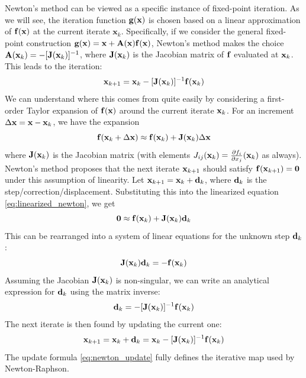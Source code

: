 Newton's method can be viewed as a specific instance of fixed-point iteration. As we will see, the iteration function $\mathbf{g}(\mathbf{x})$ is chosen based on a linear approximation of $\mathbf{f}(\mathbf{x})$ at the current iterate $\mathbf x_k$. Specifically, if we consider the general fixed-point construction $\mathbf{g}(\mathbf{x}) = \mathbf{x} + \mathbf{A}(\mathbf{x})\mathbf{f}(\mathbf{x})$, Newton's method makes the choice $\mathbf{A}(\mathbf{x}_k) = -[\mathbf{J}(\mathbf{x}_k)]^{-1}$, where $\mathbf{J}(\mathbf{x}_k)$ is the Jacobian matrix of $\mathbf{f}$ evaluated at $\mathbf{x}_k$. This leads to the iteration:
\begin{equation}
    \mathbf{x}_{k+1} = \mathbf{x}_k - [\mathbf{J}(\mathbf{x}_k)]^{-1} \mathbf{f}(\mathbf{x}_k)
\end{equation}
We can understand where this comes from quite easily by considering a first-order Taylor expansion of $\mathbf{f}(\mathbf{x})$ around the current iterate $\mathbf{x}_k$. For an increment $\Delta\mathbf{x} = \mathbf{x} - \mathbf{x}_k$, we have the expansion
\begin{equation}
    \mathbf{f}(\mathbf{x}_k + \Delta\mathbf{x}) \approx \mathbf{f}(\mathbf{x}_k) + \mathbf{J}(\mathbf{x}_k) \Delta\mathbf{x}
    \label{eq:linearized_newton}
\end{equation}
where $\mathbf{J}(\mathbf{x}_k)$ is the Jacobian matrix (with elements $J_{ij}(\mathbf{x}_k) = \tfrac{\partial f_i}{\partial x_j}(\mathbf{x}_k)$ as always). Newton's method proposes that the next iterate $\mathbf{x}_{k+1}$ should satisfy $\mathbf{f}(\mathbf{x}_{k+1}) = \mathbf{0}$ under this assumption of linearity. Let $\mathbf{x}_{k+1} = \mathbf{x}_k + \mathbf{d}_k$, where $\mathbf{d}_k$ is the step/correction/displacement. Substituting this into the linearized equation \autoref{eq:linearized_newton}, we get
\begin{equation}
    \mathbf{0} \approx \mathbf{f}(\mathbf{x}_k) + \mathbf{J}(\mathbf{x}_k) \mathbf{d}_k
\end{equation}
This can be rearranged into a system of linear equations for the unknown step $\mathbf{d}_k$:
\begin{equation}
    \mathbf{J}(\mathbf{x}_k) \mathbf{d}_k = -\mathbf{f}(\mathbf{x}_k)
\end{equation}
Assuming the Jacobian $\mathbf{J}(\mathbf{x}_k)$ is non-singular, we can write an analytical expression for $\mathbf{d}_k$ using the matrix inverse:
\begin{equation}
    \mathbf{d}_k = -[\mathbf{J}(\mathbf{x}_k)]^{-1} \mathbf{f}(\mathbf{x}_k)
\end{equation}
The next iterate is then found by updating the current one:
\begin{equation}
	\label{eq:newton_update}
    \mathbf{x}_{k+1} = \mathbf{x}_k + \mathbf{d}_k = \mathbf{x}_k - [\mathbf{J}(\mathbf{x}_k)]^{-1} \mathbf{f}(\mathbf{x}_k)
\end{equation}
The update formula \autoref{eq:newton_update} fully defines the iterative map used by Newton-Raphson. 

